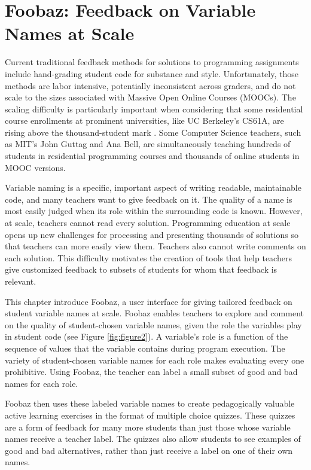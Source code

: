 \chapter{Foobaz: Feedback on Variable Names at Scale}\label{chapter:foobaz}

Current traditional feedback methods for solutions to programming assignments include hand-grading student code for substance and style. Unfortunately, those methods are labor intensive, potentially inconsistent across graders, and do not scale to the sizes associated with Massive Open Online Courses (MOOCs). The scaling difficulty is particularly important when considering that  some residential course enrollments at prominent universities, like UC Berkeley's CS61A, are rising above the thousand-student mark \cite{biggestClass}. Some Computer Science teachers, such as MIT's John Guttag and Ana Bell, are simultaneously teaching hundreds of students in residential programming courses and thousands of online students in MOOC versions.

Variable naming is a specific, important aspect of writing readable, maintainable code, and many teachers want to give feedback on it. The quality of a name is most easily judged when its role within the surrounding code is known. However, at scale, teachers cannot read every solution. Programming education at scale opens up new challenges for processing and presenting thousands of solutions so that teachers can more easily view them. Teachers also cannot write comments on each solution. This difficulty motivates the creation of tools that help teachers give customized feedback to subsets of students for whom that feedback is relevant.

This chapter introduce Foobaz, a user interface for giving tailored feedback on student variable names at scale. Foobaz enables teachers to explore and comment on the quality of student-chosen variable names, given the role the variables play in student code (see Figure \ref{fig:figure2}). A variable's role is a function of the sequence of values that the variable contains during program execution. The variety of student-chosen variable names for each role makes evaluating every one prohibitive. Using Foobaz, the teacher can label a small subset of good and bad names for each role. 

Foobaz then uses these labeled variable names to create pedagogically valuable active learning exercises in the format of multiple choice quizzes. These quizzes are a form of feedback for many more students than just those whose variable names receive a teacher label. The quizzes also allow students to see examples of good and bad alternatives, rather than just receive a label on one of their own names. 

